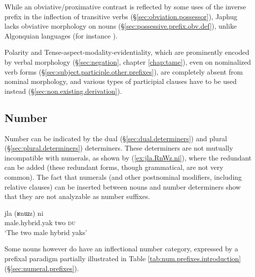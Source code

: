 While an obviative/proximative contrast is reflected by some uses of the inverse prefix in the inflection of transitive verbs (§\ref{sec:obviation.possessor}), Japhug lacks obviative morphology on nouns (§\ref{sec:possessive.prefix.obv.def}), unlike Algonquian languages (for instance \citealt[183]{valentine01grammar}).
 
 
Polarity and Tense-aspect-modality-evidentiality, which are prominently encoded by verbal morphology (§\ref{sec:negation}, chapter \ref{chap:tame}), even on nominalized verb forms (§\ref{sec:subject.participle.other.prefixes}), are completely absent from nominal morphology, and various types of participial clauses have to be used instead (§\ref{sec:non.existing.derivation}).
  

\subsection{Number}
 
Number can be indicated by the dual  (§\ref{sec:dual.determiners}) and plural  (§\ref{sec:plural.determiners}) determiners. These determiners are not mutually incompatible with numerals, as shown by (\ref{ex:jla.RnWz.ni}), where the redundant  can be added (these redundant forms, though grammatical, are not very common). The fact that numerals (and other postnominal modifiers, including relative clauses) can be inserted between nouns and number determiners show that they are not analyzable as number suffixes.

\begin{exe}
\ex \label{ex:jla.RnWz.ni}
\gll jla (ʁnɯz) ni \\
male.hybrid.yak two \textsc{du} \\
\glt `The two male hybrid yaks' 	
\end{exe}

Some nouns however do have an inflectional number category, expressed by a prefixal paradigm partially illustrated in Table \ref{tab:num.prefixes.introduction} (§\ref{sec:numeral.prefixes}). 

